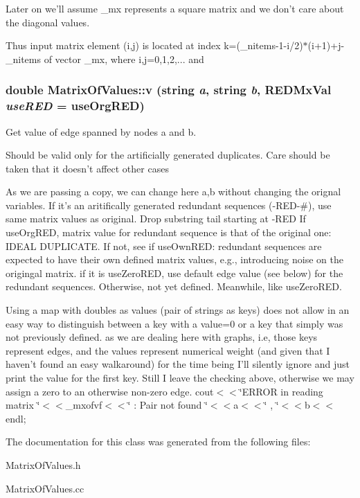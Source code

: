 Later on we'll assume \_\-mx represents a square matrix and we don't care about the diagonal values. 

Thus input matrix element (i,j) is located at index k=(\_\-nitems-1-i/2)$\ast$(i+1)+j-\_\-nitems of vector \_\-mx, where i,j=0,1,2,... and 
\subsubsection{\setlength{\rightskip}{0pt plus 5cm}double Matrix\-Of\-Values::v (string {\em a}, string {\em b}, REDMx\-Val {\em use\-RED} = use\-Org\-RED)}\label{classMatrixOfValues_a17}


Get value of edge spanned by nodes a and b. 

Should be valid only for the artificially generated duplicates. Care should be taken that it doesn't affect other cases

As we are passing a copy, we can change here a,b without changing the orignal variables. If it's an aritifically generated redundant sequences (-RED-\#), use same matrix values as original. Drop substring tail starting at -RED If use\-Org\-RED, matrix value for redundant sequence is that of the original one: IDEAL DUPLICATE. If not, see if use\-Own\-RED: redundant sequences are expected to have their own defined matrix values, e.g., introducing noise on the origingal matrix. if it is use\-Zero\-RED, use default edge value (see below) for the redundant sequences. Otherwise, not yet defined. Meanwhile, like use\-Zero\-RED.

Using a map with doubles as values (pair of strings as keys) does not allow in an easy way to distinguish between a key with a value=0 or a key that simply was not previously defined. as we are dealing here with graphs, i.e, those keys represent edges, and the values represent numerical weight (and given that I haven't found an easy walkaround) for the time being I'll silently ignore and just print the value for the first key. Still I leave the checking above, otherwise we may assign a zero to an otherwise non-zero edge. cout$<$$<$\char`\"{}ERROR in reading matrix \char`\"{}$<$$<$\_\-mxofvf$<$$<$\char`\"{} : Pair not found \char`\"{}$<$$<$a$<$$<$\char`\"{} , \char`\"{}$<$$<$b$<$$<$endl; 

The documentation for this class was generated from the following files:\begin{CompactItemize}
\item 
Matrix\-Of\-Values.h\item 
Matrix\-Of\-Values.cc\end{CompactItemize}
